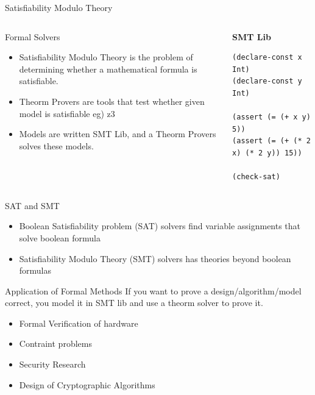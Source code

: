 \documentclass{beamer}
\begin{document}
\begin{frame}[fragile]{Satisfiability Modulo Theory}
  \begin{columns}
    \begin{column}{0.5\textwidth}
      Formal Solvers
      \begin{itemize}
        \item Satisfiability Modulo Theory is the problem of determining whether a 
      mathematical formula is satisfiable.
        \item Theorm Provers are tools that test whether given model is satisfiable eg) z3
        \item Models are written SMT Lib, and a Theorm Provers solves these models.
      \end{itemize}
    \end{column}
    \begin{column}{0.5\textwidth}
      \begin{center}
        \textbf{SMT Lib}
      \end{center}
      \begin{verbatim}
(declare-const x Int)
(declare-const y Int)

(assert (= (+ x y) 5))
(assert (= (+ (* 2 x) (* 2 y)) 15))

(check-sat)
      \end{verbatim}
    \end{column}
  \end{columns}
\end{frame}

\begin{frame}{SAT and SMT}
  \begin{itemize}
    \item Boolean Satisfiability problem (SAT) solvers find variable assignments that solve boolean formula
    \item Satisfiability Modulo Theory (SMT) solvers has theories beyond boolean formulas
  \end{itemize}
\end{frame}

\begin{frame}{Application of Formal Methods}
  If you want to prove a design/algorithm/model correct, you model it in SMT lib and use a theorm solver to prove it.

  \begin{itemize}
    \item Formal Verification of hardware
    \item Contraint problems
    \item Security Research
    \item Design of Cryptographic Algorithms
  \end{itemize}
\end{frame}
\end{document}

